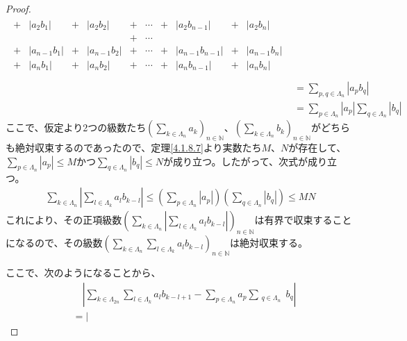\documentclass[dvipdfmx]{jsarticle}
\begin{document}
\begin{proof}
\begin{align*}
\begin{matrix}
 + & \left| a_{2}b_{1} \right| & + & \left| a_{2}b_{2} \right| & + & \cdots & + & \left| a_{2}b_{n - 1} \right| & + & \left| a_{2}b_{n} \right| \\
\  & \  & \  & \  & + & \cdots & \  & \  & \  & \  \\
 + & \left| a_{n - 1}b_{1} \right| & + & \left| a_{n - 1}b_{2} \right| & + & \cdots & + & \left| a_{n - 1}b_{n - 1} \right| & + & \left| a_{n - 1}b_{n} \right| \\
 + & \left| a_{n}b_{1} \right| & + & \left| a_{n}b_{2} \right| & + & \cdots & + & \left| a_{n}b_{n - 1} \right| & + & \left| a_{n}b_{n} \right| \\
\end{matrix}\\
&= \sum_{p,q \in \varLambda_{n}} \left| a_{p}b_{q} \right|\\
&= \sum_{p \in \varLambda_{n}} \left| a_{p} \right|\sum_{q \in \varLambda_{n}} \left| b_{q} \right|
\end{align*}
ここで、仮定より2つの級数たち$\left( \sum_{k \in \varLambda_{n}} a_{k} \right)_{n \in \mathbb{N}}$、$\left( \sum_{k \in \varLambda_{n}} b_{k} \right)_{n \in \mathbb{N}}$がどちらも絶対収束するのであったので、定理\ref{4.1.8.7}より実数たち$M$、$N$が存在して、$\sum_{p \in \varLambda_{n}} \left| a_{p} \right| \leq M$かつ$\sum_{q \in \varLambda_{n}} \left| b_{q} \right| \leq N$が成り立つ。したがって、次式が成り立つ。
\begin{align*}
\sum_{k \in \varLambda_{n}} \left| \sum_{l \in \varLambda_{k}} {a_{l}b_{k - l}} \right| \leq \left( \sum_{p \in \varLambda_{n}} \left| a_{p} \right| \right)\left( \sum_{q \in \varLambda_{n}} \left| b_{q} \right| \right) \leq MN
\end{align*}
これにより、その正項級数$\left( \sum_{k \in \varLambda_{n}} \left| \sum_{l \in \varLambda_{k}} {a_{l}b_{k - l}} \right| \right)_{n \in \mathbb{N}}$は有界で収束することになるので、その級数$\left( \sum_{k \in \varLambda_{n}} {\sum_{l \in \varLambda_{k}} {a_{l}b_{k - l}}} \right)_{n \in \mathbb{N}}$は絶対収束する。\par
ここで、次のようになることから、
\begin{align*}
&\quad \left| \sum_{k \in \varLambda_{2n}} {\sum_{l \in \varLambda_{k}} {a_{l}b_{k - l + 1}}} - \sum_{p \in \varLambda_{n}} a_{p}\sum_{\begin{matrix}
q \in \varLambda_{n} \\
\end{matrix}} b_{q} \right|\\
&= \left| \begin{matrix}

\end{matrix}
\end{align*}
\end{proof}
\end{document}
